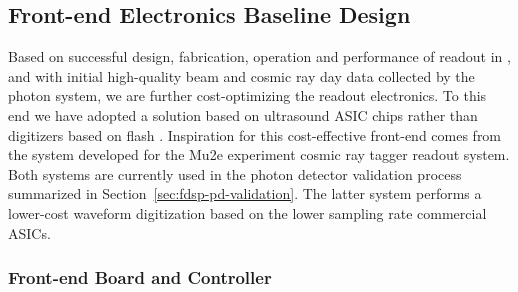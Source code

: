 \subsection{Front-end Electronics Baseline Design}
\label{sec:electronics}

Based on successful design, fabrication, operation and performance of  readout in , and with initial high-quality beam and cosmic ray day data collected by the  photon system, we are %
further cost-optimizing the readout electronics.  To this end we have adopted a solution based on ultrasound ASIC chips rather than digitizers based on flash . Inspiration for %
this cost-effective front-end comes from the system developed for the Mu2e experiment cosmic ray tagger readout system.
Both systems are currently used in the photon detector validation process summarized in Section~\ref{sec:fdsp-pd-validation}. The latter system 
performs a lower-cost waveform digitization based on the lower sampling rate commercial ASICs.


\subsubsection{Front-end Board and Controller}

